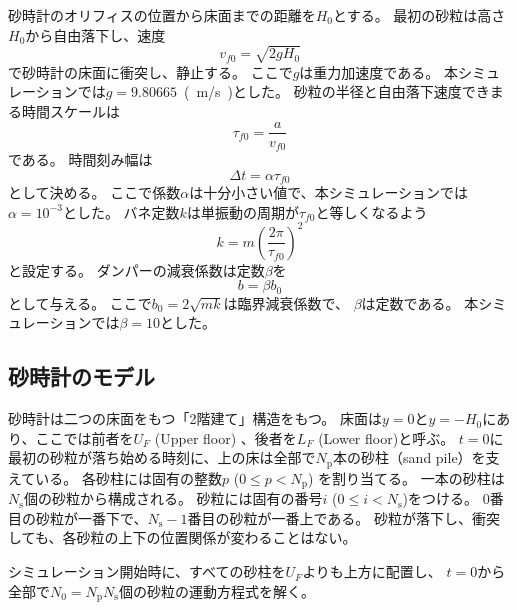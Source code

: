 \documentclass[dvipdfmx]{article}
\begin{document}
砂時計のオリフィスの位置から床面までの距離を$H_0$とする。
最初の砂粒は高さ$H_0$から自由落下し、速度
\begin{equation} \label{250919160111} 
   v_{f0} = \sqrt{2gH_0}
\end{equation}
で砂時計の床面に衝突し、静止する。
ここで$g$は重力加速度である。
本シミュレーションでは$g=9.80665$~\si{(m/s)}とした。
砂粒の半径と自由落下速度できまる時間スケールは
\begin{equation} \label{250919160801} 
   \tau_{f0} = \frac{a}{v_{f0}}
\end{equation}
である。
時間刻み幅は
\begin{equation} \label{250919160045} 
   \Delta t = \alpha \tau_{f0}
\end{equation}
として決める。
ここで係数$\alpha$は十分小さい値で、本シミュレーションでは$\alpha=10^{-3}$とした。
バネ定数$k$は単振動の周期が$\tau_{f0}$と等しくなるよう
\begin{equation} \label{250919161147} 
   k = m\left(\frac{2\pi}{\tau_{f0}}\right)^2
\end{equation}
と設定する。
ダンパーの減衰係数は定数$\beta$を
\begin{equation} \label{250919162003} 
   b = \beta b_0
\end{equation}
として与える。
ここで$b_0=2\sqrt{mk}$は臨界減衰係数で、
$\beta$は定数である。
本シミュレーションでは$\beta=10$とした。


\subsection{砂時計のモデル}
砂時計は二つの床面をもつ「2階建て」構造をもつ。
床面は$y=0$と$y=-H_0$にあり、ここでは前者を$U_F$ (Upper floor) 、後者を$L_F$ (Lower floor)と呼ぶ。
$t=0$に最初の砂粒が落ち始める時刻に、上の床は全部で$N_\text{p}$本の砂柱（sand pile）を支えている。
各砂柱には固有の整数$p$ ($0\le p < N_\text{p}$) を割り当てる。
一本の砂柱は$N_\text{s}$個の砂粒から構成される。
砂粒には固有の番号$i$ ($0\le i < N_\text{s}$)をつける。
$0$番目の砂粒が一番下で、$N_\text{s}-1$番目の砂粒が一番上である。
砂粒が落下し、衝突しても、各砂粒の上下の位置関係が変わることはない。


シミュレーション開始時に、すべての砂柱を$U_F$よりも上方に配置し、
$t=0$から全部で$N_0 = N_\text{p} N_\text{s}$個の砂粒の運動方程式を解く。
\end{document}
